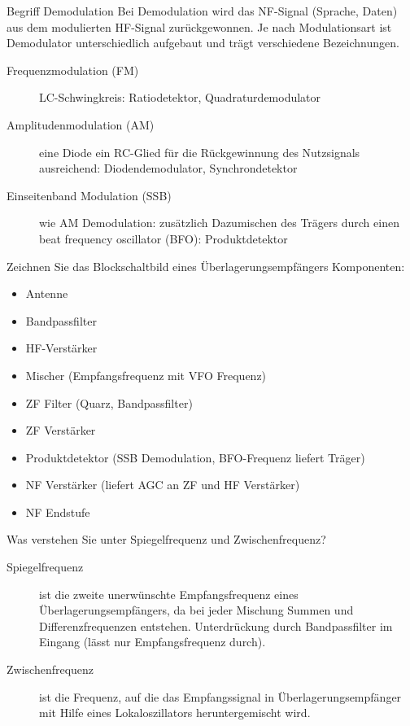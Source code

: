 \documentclass[avery5371,grid,frame,a4paper]{flashcards}
\newcommand{\card}[3]{
  \begin{flashcard}[{\chap} -- #1]{#2}#3\end{flashcard}
}
\begin{document}
\card{36}{Begriff Demodulation}{
  \footnotesize
  Bei Demodulation wird das NF-Signal (Sprache, Daten) aus dem modulierten HF-Signal zurückgewonnen.
  Je nach Modulationsart ist Demodulator unterschiedlich aufgebaut und trägt verschiedene Bezeichnungen.

  \begin{description}
    \item[Frequenzmodulation (FM)]
      LC-Schwingkreis:
      Ratiodetektor, Quadraturdemodulator
    \item[Amplitudenmodulation (AM)]
      eine Diode ein RC-Glied für die Rückgewinnung des Nutzsignals ausreichend:
      Diodendemodulator, Synchrondetektor
    \item[Einseitenband Modulation (SSB)]
      wie AM Demodulation: zusätzlich Dazumischen des Trägers durch einen beat frequency oscillator (BFO):
      Produktdetektor
  \end{description}
}
\card{37}{Zeichnen Sie das Blockschaltbild eines Überlagerungsempfängers}{
  \footnotesize
  Komponenten:
  \begin{itemize}
    \item Antenne
    \item Bandpassfilter
    \item HF-Verstärker
    \item Mischer (Empfangsfrequenz mit VFO Frequenz)
    \item ZF Filter (Quarz, Bandpassfilter)
    \item ZF Verstärker
    \item Produktdetektor (SSB Demodulation, BFO-Frequenz liefert Träger)
    \item NF Verstärker (liefert AGC an ZF und HF Verstärker)
    \item NF Endstufe
  \end{itemize}
}
\card{38}{Was verstehen Sie unter Spiegelfrequenz und Zwischenfrequenz?}{
  \begin{description}
    \item[Spiegelfrequenz]
      ist die zweite unerwünschte Empfangsfrequenz eines Überlagerungsempfängers,
      da bei jeder Mischung Summen und Differenzfrequenzen entstehen.
      Unterdrückung durch Bandpassfilter im Eingang (lässt nur Empfangsfrequenz durch).
    \item[Zwischenfrequenz]
      ist die Frequenz,
      auf die das Empfangssignal in Überlagerungsempfänger mit Hilfe eines Lokaloszillators heruntergemischt wird.
  \end{description}
}
\end{document}
